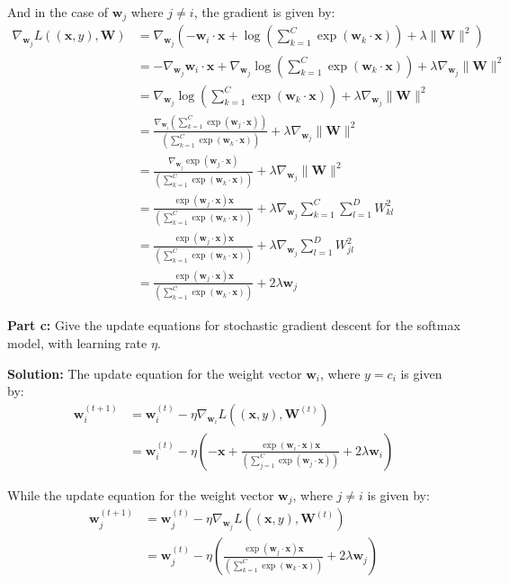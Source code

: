 \documentclass{article}
\renewcommand{\vec}[1]{\mathbf{#1}}
\newcommand{\mat}[1]{\mathbf{#1}}
\begin{document}
And in the case of $\vec w_j$ where $j\not=i$, the gradient is given by:
\begin{align*}
    \nabla_{\vec w_j}L((\vec x,y),\mat W)&=\nabla_{\vec w_j}\left(-\vec w_i\cdot\vec x+\log\left(\sum_{k=1}^C\exp(\vec w_k\cdot\vec x)\right)+\lambda\|\mat W\|^2\right)\\
    &=-\nabla_{\vec w_j}\vec w_i\cdot\vec x+\nabla_{\vec w_j}\log\left(\sum_{k=1}^C\exp(\vec w_k\cdot\vec x)\right)+\lambda\nabla_{\vec w_j}\|\mat W\|^2\\
    &=\nabla_{\vec w_j}\log\left(\sum_{k=1}^C\exp(\vec w_k\cdot\vec x)\right)+\lambda\nabla_{\vec w_j}\|\mat W\|^2\\
    &=\frac{\nabla_{\vec w_i}\left(\sum_{k=1}^C\exp(\vec w_j\cdot\vec x)\right)}{\left(\sum_{k=1}^C\exp(\vec w_k\cdot\vec x)\right)}+\lambda\nabla_{\vec w_j}\|\mat W\|^2\tag{chain rule}\\
    &=\frac{\nabla_{\vec w_j}\exp(\vec w_j\cdot\vec x)}{\left(\sum_{k=1}^C\exp(\vec w_k\cdot\vec x)\right)}+\lambda\nabla_{\vec w_j}\|\mat W\|^2\\
    &=\frac{\exp(\vec w_j\cdot\vec x)\vec x}{\left(\sum_{k=1}^C\exp(\vec w_k\cdot\vec x)\right)}+\lambda\nabla_{\vec w_j}\sum_{k=1}^C\sum_{l=1}^DW_{kl}^2\\
    &=\frac{\exp(\vec w_j\cdot\vec x)\vec x}{\left(\sum_{k=1}^C\exp(\vec w_k\cdot\vec x)\right)}+\lambda\nabla_{\vec w_j}\sum_{l=1}^DW_{jl}^2\\
    &=\frac{\exp(\vec w_j\cdot\vec x)\vec x}{\left(\sum_{k=1}^C\exp(\vec w_k\cdot\vec x)\right)}+2\lambda\vec w_j
\end{align*}
\bigskip

\noindent\textbf{Part c:} Give the update equations for stochastic gradient descent for the softmax model, with learning rate $\eta$.
\bigskip

\noindent\textbf{Solution:} The update equation for the weight vector $\vec w_i$, where $y=c_i$ is given by:
\begin{align*}
    \vec w_i^{(t+1)}&=\vec w_i^{(t)}-\eta\nabla_{\vec w_i}L((\vec x,y),\mat W^{(t)})\\
    &=\vec w_i^{(t)}-\eta\left(-\vec x+\frac{\exp(\vec w_i\cdot\vec x)\vec x}{\left(\sum_{j=1}^C\exp(\vec w_j\cdot\vec x)\right)}+2\lambda\vec w_i\right)
\end{align*}
\smallskip

While the update equation for the weight vector $\vec w_j$, where $j\not=i$ is given by:
\begin{align*}
    \vec w_j^{(t+1)}&=\vec w_j^{(t)}-\eta\nabla_{\vec w_j}L((\vec x,y),\mat W^{(t)})\\
    &=\vec w_j^{(t)}-\eta\left(\frac{\exp(\vec w_j\cdot\vec x)\vec x}{\left(\sum_{k=1}^C\exp(\vec w_k\cdot\vec x)\right)}+2\lambda\vec w_j\right)
\end{align*}
\bigskip
\end{document}
